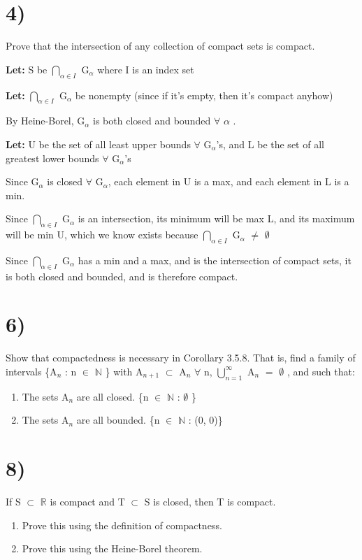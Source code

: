 \documentclass{article}
\newcommand{\mt}[1]{\ensuremath{#1}}
\newcommand\bsc[2][\DefaultOpt]{%
  \def\DefaultOpt{#2}%
  \section[#1]{#2}%
}
\newcommand{\balist}{\begin{enumerate}[label=\alph*.]}
\newcommand{\elist}{\end{enumerate}}
\newcommand{\lt}[1]{\textbf{Let: } #1}
\newcommand{\br}{\mt{\mathbb{R}} }       %
\newcommand{\bn}{\mt{\mathbb{N}} }       %
\newcommand{\fa}{\mt{\forall} }          %
\newcommand{\afa}{\mt{\alpha} }
\newcommand{\mem}{\mt{\in} }
\newcommand{\es}{\mt{\emptyset} }        %
\newcommand{\sbs}{\mt{\subset} }         %
\newcommand{\eql}{\mt{=} }
\newcommand{\uw}[2]{#1\mt{_{#2}}}
\newcommand{\urng}[2]{\mt{\bigcup_{#1}^{#2}}}
\newcommand{\nrng}[2]{\mt{\bigcap_{#1}^{#2}}}
\begin{document}
\bsc{4)}{
Prove that the intersection of any collection of compact sets is compact.

\lt{S be \nrng{\afa \mem I}{} \uw{G}{\afa} where I is an index set}

\lt{\nrng{\afa \mem I}{} \uw{G}{\afa} be nonempty (since if it's empty, then it's compact anyhow)}


By Heine-Borel, \uw{G}{\afa} is both closed and bounded \fa \afa.

\lt{U be the set of all least upper bounds \fa \uw{G}{\afa}'s, and L be the set of all greatest lower bounds \fa \uw{G}{\afa}'s}

Since \uw{G}{\afa} is closed \fa \uw{G}{\afa}, each element in U is a max, and each element in L is a min.

Since \nrng{\afa \mem I}{} \uw{G}{\afa} is an intersection, its minimum will be max L, and its maximum will be min U, which we know exists because \nrng{\afa \mem I}{} \uw{G}{\afa} $\neq$ \es

Since \nrng{\afa \mem I}{} \uw{G}{\afa} has a min and a max, and is the intersection of compact sets, it is both closed and bounded, and is therefore compact.

}

\bsc{6)}{
Show that compactedness is necessary in Corollary 3.5.8. That is, find a family of intervals \{\uw{A}{n} : n \mem \bn\} with \uw{A}{n + 1} \sbs \uw{A}{n} \fa n, \urng{n = 1}{\infty} \uw{A}{n} \eql \es, and such that:

\balist
\item The sets \uw{A}{n} are all closed. \{n \mem \bn : \es\}
\item The sets \uw{A}{n} are all bounded. \{n \mem \bn : (0, 0)\}
\elist

}

\bsc{8)}{
If S \sbs \br is compact and T \sbs S is closed, then T is compact.

\balist
\item Prove this using the definition of compactness.
\item Prove this using the Heine-Borel theorem.
\elist

}
\end{document}
